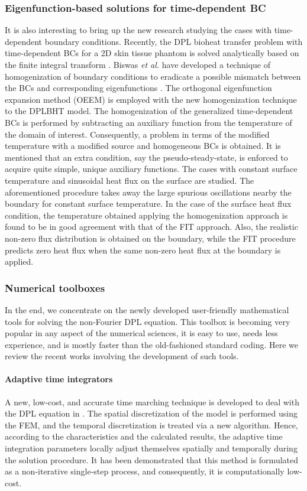 \documentclass[sn-mathphys]{sn-jnl}%
\theoremstyle{thmstyleone}%
\theoremstyle{thmstyletwo}%
\theoremstyle{thmstylethree}%
\begin{document}
\subsubsection{Eigenfunction-based solutions for time-dependent BC}
It is also interesting to bring up the new research studying the cases with time-dependent boundary conditions. Recently, the DPL bioheat transfer problem with time-dependent BCs for a 2D skin tissue phantom is solved analytically based on the finite integral transform \cite{Abdel-Hamid1999}. Biswas \emph{et al.} have developed a technique of homogenization of boundary conditions to eradicate a possible mismatch between the BCs and corresponding eigenfunctions \cite{Biswas20201}. The orthogonal eigenfunction expansion method (OEEM) is employed with the new homogenization technique to the DPLBHT model. The homogenization of the generalized time-dependent BCs is performed by subtracting an auxiliary function from the temperature of the domain of interest. Consequently, a problem in terms of the modified temperature with a modified source and homogeneous BCs is obtained. It is mentioned that an extra condition, say the pseudo-steady-state, is enforced to acquire quite simple, unique auxiliary functions. The cases with constant surface temperature and sinusoidal heat flux on the surface are studied. The aforementioned procedure takes away the large spurious oscillations nearby the boundary for constant surface temperature. In the case of the surface heat flux condition, the temperature obtained applying the homogenization approach is found to be in good agreement with that of the FIT approach. Also, the realistic non-zero flux distribution is obtained on the boundary, while the FIT procedure predicts zero heat flux when the same non-zero heat flux at the boundary is applied.

\subsubsection{Numerical toolboxes}
In the end, we concentrate on the newly developed user-friendly mathematical tools for solving the non-Fourier DPL equation. This toolbox is becoming very popular in any aspect of the numerical sciences, it is easy to use, needs less experience, and is mostly faster than the old-fashioned standard coding. Here we review the recent works involving the development of such tools.

\paragraph{Adaptive time integrators}
A new, low-cost, and accurate time marching technique is developed to deal with the DPL equation in \cite{Soares2018}. The spatial discretization of the model is performed using the FEM, and the temporal discretization is treated via a new algorithm. Hence, according to the characteristics and the calculated results, the adaptive time integration parameters locally adjust themselves spatially and temporally during the solution procedure. It has been demonstrated that this method is formulated as a non-iterative single-step process, and consequently, it is computationally low-cost. 
\end{document}
